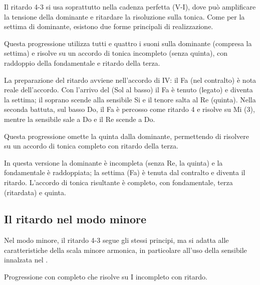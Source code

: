 Il ritardo 4-3 si usa soprattutto nella cadenza perfetta (V-I), dove può amplificare la tensione della dominante e ritardare la risoluzione sulla tonica. Come per la settima di dominante, esistono due forme principali di realizzazione.

\begin{esempio}
	\label{ex:ritardo_completo_maggiore}
	Questa progressione utilizza tutti e quattro i suoni sulla dominante (compresa la settima) e risolve su un accordo di tonica incompleto (senza quinta), con raddoppio della fondamentale e ritardo della terza.
	
	
	La preparazione del ritardo avviene nell'accordo di IV: il Fa (nel contralto) è nota reale dell'accordo. Con l'arrivo del  (Sol al basso) il Fa è tenuto (legato) e diventa la settima; il soprano scende alla sensibile Si e il tenore salta al Re (quinta). Nella seconda battuta, sul basso Do, il Fa è percosso come ritardo 4 e risolve su Mi (3), mentre la sensibile sale a Do e il Re scende a Do.
\end{esempio}

\begin{esempio}
	\label{ex:ritardo_incompleto_maggiore}
	Questa progressione omette la quinta dalla dominante, permettendo di risolvere su un accordo di tonica completo con ritardo della terza.
	
	
	In questa versione la dominante è incompleta (senza Re, la quinta) e la fondamentale è raddoppiata; la settima (Fa) è tenuta dal contralto e diventa il ritardo. L'accordo di tonica risultante è completo, con fondamentale, terza (ritardata) e quinta.
\end{esempio}

\subsection{Il ritardo nel modo minore}
\label{subsec:ritardo_minore}

Nel modo minore, il ritardo 4-3 segue gli stessi principi, ma si adatta alle caratteristiche della scala minore armonica, in particolare all'uso della sensibile innalzata nel .

\begin{esempio}
	\label{ex:ritardo_completo_minore}
	Progressione con  completo che risolve su I incompleto con ritardo.
	
\end{esempio}

